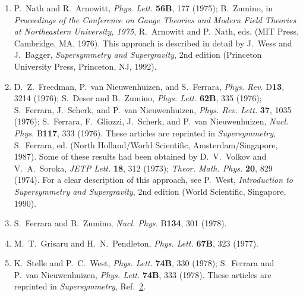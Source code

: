 


\begin{enumerate}
  \item {}\label{ch31-ref-1}
  P.~Nath and R.~Arnowitt, \textit{Phys. Lett.} \textbf{56B}, 177
  (1975); B.~Zumino, in \textit{Proceedings of the Conference on Gauge
  Theories and Modern Field Theories at Northeastern University, 1975},
  R.~Arnowitt and P.~Nath, eds. (MIT Press, Cambridge, MA, 1976). This
  approach is described in detail by J.~Wess and J.~Bagger,
  \textit{Supersymmetry and Supergravity}, 2nd edition (Princeton
  University Press, Princeton, NJ, 1992).

  \item {}\label{ch31-ref-2}
  D.~Z.~Freedman, P.~van Nieuwenhuizen, and S.~Ferrara,
  \textit{Phys. Rev.} D\textbf{13}, 3214 (1976); S.~Deser and
  B.~Zumino, \textit{Phys. Lett.} \textbf{62B}, 335 (1976);
  S.~Ferrara, J.~Scherk, and P.~van Nieuwenhuizen,
  \textit{Phys. Rev. Lett.} \textbf{37}, 1035 (1976); S.~Ferrara,
  F.~Gliozzi, J.~Scherk, and P.~van Nieuwenhuizen,
  \textit{Nucl. Phys.} B\textbf{117}, 333 (1976). These articles are
  reprinted in \textit{Supersymmetry}, S.~Ferrara, ed. (North
  Holland/World Scientific, Amsterdam/Singapore, 1987). Some of these
  results had been obtained by D.~V.~Volkov and V.~A.~Soroka,
  \textit{JETP Lett.} \textbf{18}, 312 (1973);
  \textit{Theor. Math. Phys.} \textbf{20}, 829 (1974). For a clear
  description of this approach, see P.~West, \textit{Introduction to
  Supersymmetry and Supergravity}, 2nd edition (World Scientific,
  Singapore, 1990).

  \item {}\label{ch31-ref-3}
  S.~Ferrara and B.~Zumino, \textit{Nucl. Phys.} B\textbf{134}, 301
  (1978).

  \item[3a.] \label{ch31-ref-3a}
  M.~T.~Grisaru and H.~N.~Pendleton, \textit{Phys. Lett.}
  \textbf{67B}, 323 (1977).

  \item {}\label{ch31-ref-4}
  K.~Stelle and P.~C.~West, \textit{Phys. Lett.} \textbf{74B}, 330
  (1978); S.~Ferrara and P.~van Nieuwenhuizen, \textit{Phys. Lett.}
  \textbf{74B}, 333 (1978). These articles are reprinted in
  \textit{Supersymmetry}, Ref.~\hyperref[ch31-ref-2]{2}.


\end{enumerate}
